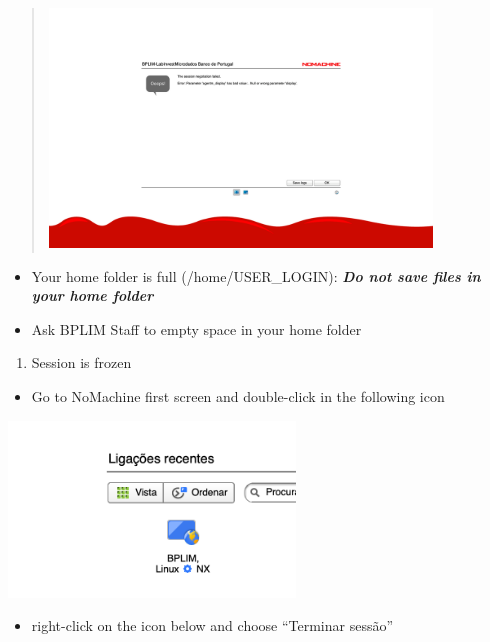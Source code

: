 \documentclass[
  11pt,
  a4paper,
]{article}
\providecommand{\tightlist}{%
  \setlength{\itemsep}{0pt}\setlength{\parskip}{0pt}}
\begin{document}
\begin{quote}
\includegraphics[width=4.01667in,height=2.49995in]{./media/parameter_bad_value.png}
\end{quote}

\begin{itemize}
\item
  Your home folder is full (/home/USER\_LOGIN): \textbf{\emph{Do not
  save files in your home folder}}
\item
  Ask BPLIM Staff to empty space in your home folder
\end{itemize}

\begin{enumerate}
\def\labelenumi{\arabic{enumi}.}
\setcounter{enumi}{7}
\tightlist
\item
  Session is frozen
\end{enumerate}

\begin{itemize}
\tightlist
\item
  Go to NoMachine first screen and double-click in the following icon
\end{itemize}

\includegraphics[width=3in,height=\textheight]{./media/logout1.png}

\begin{itemize}
\tightlist
\item
  right-click on the icon below and choose ``Terminar sessão''
\end{itemize}
\end{document}
